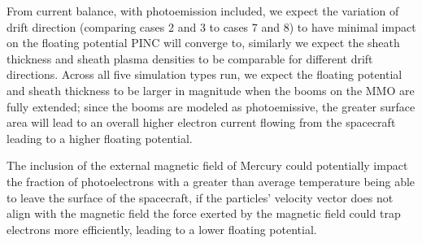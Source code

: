 From current balance, with photoemission included, we expect the variation of drift direction (comparing cases 2 and 3 to cases 7 and 8) to have minimal impact on the floating potential PINC will converge to, similarly we expect the sheath thickness and sheath plasma densities to be comparable for different drift directions. Across all five simulation types run, we expect the floating potential and sheath thickness to be larger in magnitude when the booms on the MMO are fully extended; since the booms are modeled as photoemissive, the greater surface area will lead to an overall higher electron current flowing from the spacecraft leading to a higher floating potential. 

The inclusion of the external magnetic field of Mercury could potentially impact the fraction of photoelectrons with a greater than average temperature being able to leave the surface of the spacecraft, if the particles' velocity vector does not align with the magnetic field the force exerted by the magnetic field could trap electrons more efficiently, leading to a lower floating potential.        

